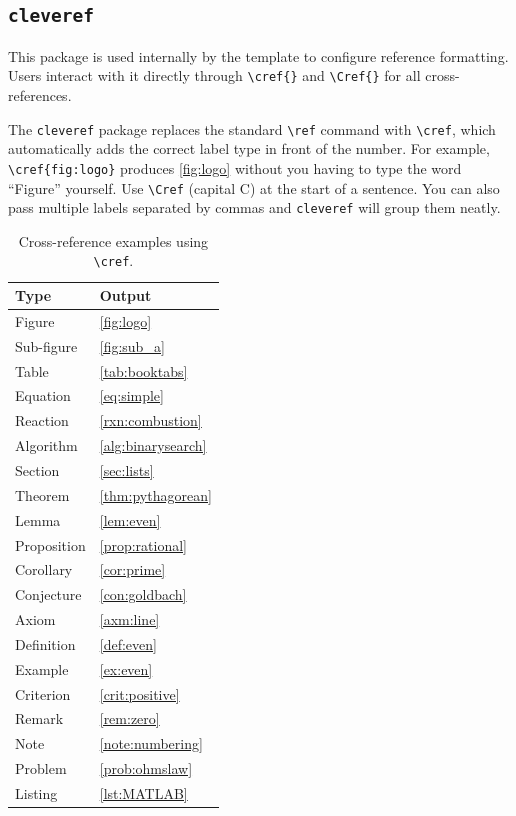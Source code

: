 \subsection{\texttt{cleveref}}
\noindent\colorbox{themecolour!15}{\parbox{\linewidth}{\small This package is used internally by the template to configure reference formatting. Users interact with it directly through \texttt{\textbackslash cref\{\}} and \texttt{\textbackslash Cref\{\}} for all cross-references.}}\vspace{0.5\baselineskip}

The \texttt{cleveref} package replaces the standard \texttt{\textbackslash ref} command with \texttt{\textbackslash cref}, which automatically adds the correct label type in front of the number. For example, \texttt{\textbackslash cref\{fig:logo\}} produces \cref{fig:logo} without you having to type the word ``Figure'' yourself. Use \texttt{\textbackslash Cref} (capital C) at the start of a sentence. You can also pass multiple labels separated by commas and \texttt{cleveref} will group them neatly.

\begin{table}[H]
	\centering
	\caption{Cross-reference examples using \texttt{\textbackslash cref}.}
	\label{tab:cleveref}
	\begin{tabular}{@{}ll@{}}
		\toprule
		Type & Output \\
		\midrule
		Figure      & \cref{fig:logo} \\
		Sub-figure  & \cref{fig:sub_a} \\
		Table       & \cref{tab:booktabs} \\
		Equation    & \cref{eq:simple} \\
		Reaction    & \cref{rxn:combustion} \\
		Algorithm   & \cref{alg:binarysearch} \\
		Section     & \cref{sec:lists} \\
		Theorem     & \cref{thm:pythagorean} \\
		Lemma       & \cref{lem:even} \\
		Proposition & \cref{prop:rational} \\
		Corollary   & \cref{cor:prime} \\
		Conjecture  & \cref{con:goldbach} \\
		Axiom       & \cref{axm:line} \\
		Definition  & \cref{def:even} \\
		Example     & \cref{ex:even} \\
		Criterion   & \cref{crit:positive} \\
		Remark      & \cref{rem:zero} \\
		Note        & \cref{note:numbering} \\
		Problem     & \cref{prob:ohmslaw} \\
		Listing     & \cref{lst:MATLAB} \\
		\bottomrule
	\end{tabular}
\end{table}

